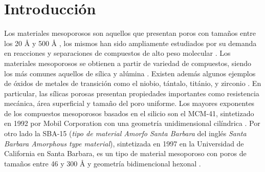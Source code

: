 \documentclass[fleqn,11pt]{SelfArx}
\begin{document}
	\flushbottom %
	
	\maketitle %
	
	
	\thispagestyle{empty} %
	\renewcommand{\tablename}{Tabla} 
	
	
	
	\section*{Introducci\'on}
	
	Los materiales mesoporosos son aquellos que presentan poros con tama\~nos entre los 20 \r{A} y 500 \r{A} \cite{macnaught_wilkinson_1997}, los mismos han sido ampliamente estudiados por su demanda en reacciones y separaciones de compuestos de alto peso molecular \cite{zhao_1998}. Los materiales mesoporosos se obtienen a partir de variedad de compuestos, siendo los m\'as comunes aquellos de s\'ilica y al\'umina \cite{mitra_bhaumik_paul_2008}. Existen adem\'as algunos ejemplos de \'oxidos de metales de transici\'on como el niobio, t\'antalo, tit\'anio, y zirconio \cite{mitra_bhaumik_paul_2008, lee_lu_kondo_domen_2002,noda_lee_domen_kondo_2008, parvulescu_bonnemann_parvulescu_endruschat_rufinska_lehmann_tesche_poncelet_2001}. En particular, las s\'ilicas porosas presentan propiedades importantes como resistencia mec\'anica, \'area superficial y tama\~no del poro uniforme. Los mayores exponentes de los compuestos mesoporosos basados en el silicio son el MCM-41, sintetizado en 1992 por Mobil Corporation con una geometr\'ia unidimensional cil\'indrica \cite{zhao_1998}. Por otro lado la SBA-15 (\textit{tipo de material Amorfo Santa Barbara} del ingl\'es \textit{Santa Barbara Amorphous type material}), sintetizada en 1997 en la Universidad de California en Santa Barbara, es un tipo de material mesoporoso con poros de tama\~nos entre 46 y 300 \r{A} y geometr\'ia bidimencional hexonal \cite{zhao_1998}.
	
\end{document}
